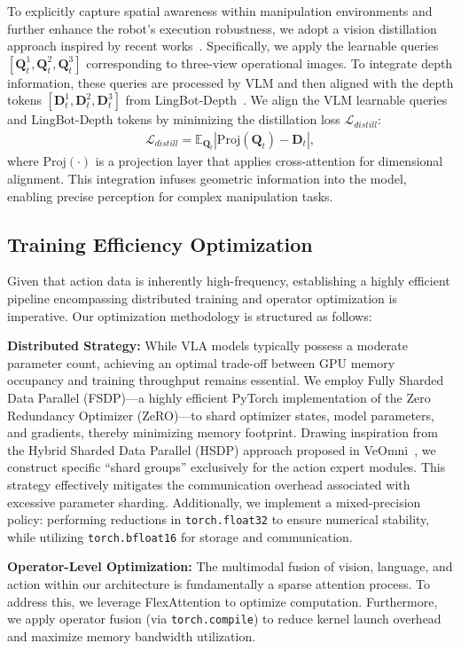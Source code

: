 To explicitly capture spatial awareness within manipulation environments and further enhance the robot's execution robustness, we adopt a vision distillation approach inspired by recent works~\cite{wang2025vision,huang2025mllms}. Specifically, we apply the learnable queries $[\mathbf{Q}^1_t, \mathbf{Q}^2_t,\mathbf{Q}^3_t]$ corresponding to three-view operational images. To integrate depth information, these queries are processed by VLM and then aligned with the depth tokens $[\mathbf{D}^1_t, \mathbf{D}^2_t,\mathbf{D}^3_t]$ from LingBot-Depth~\cite{lingbotdepth}. 
We align the VLM learnable queries and LingBot-Depth tokens by minimizing the distillation loss $\mathcal{L}_{distill}$:
\begin{align}
\mathcal{L}_{distill} =\mathbb{E}_{\mathbf{Q}_t}\left|{ \text{Proj}(\mathbf{Q}_t)} - \mathbf{D}_t\right|,
\label{eq::2}%
\end{align}%
where $\text{Proj}(\cdot)$ is a projection layer that applies cross-attention for dimensional alignment. This integration infuses geometric information into the \method model, enabling precise perception for complex manipulation tasks.

\subsection{Training Efficiency Optimization}

Given that action data is inherently high-frequency, establishing a highly efficient pipeline encompassing distributed training and operator optimization is imperative. Our optimization methodology is structured as follows:


\textbf{Distributed Strategy:} While VLA models typically possess a moderate parameter count, achieving an optimal trade-off between GPU memory occupancy and training throughput remains essential. We employ Fully Sharded Data Parallel (FSDP)—a highly efficient PyTorch implementation of the Zero Redundancy Optimizer (ZeRO)—to shard optimizer states, model parameters, and gradients, thereby minimizing memory footprint. Drawing inspiration from the Hybrid Sharded Data Parallel (HSDP) approach proposed in VeOmni~\cite{ma2025veomni}, we construct specific ``shard groups'' exclusively for the action expert modules. This strategy effectively mitigates the communication overhead associated with excessive parameter sharding. Additionally, we implement a mixed-precision policy: performing reductions in \texttt{torch.float32} to ensure numerical stability, while utilizing \texttt{torch.bfloat16} for storage and communication.

\textbf{Operator-Level Optimization:} The multimodal fusion of vision, language, and action within our architecture is fundamentally a sparse attention process. To address this, we leverage FlexAttention to optimize computation. Furthermore, we apply operator fusion (via \texttt{torch.compile}) to reduce kernel launch overhead and maximize memory bandwidth utilization.

